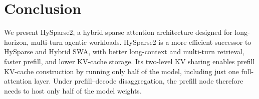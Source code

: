 \section{Conclusion}

We present HySparse2, a hybrid sparse attention architecture designed for long-horizon, multi-turn agentic workloads. HySparse2 is a more efficient successor to HySparse and Hybrid SWA, with better long-context and multi-turn retrieval, faster prefill, and lower KV-cache storage.
Its two-level KV sharing enables prefill KV-cache construction by running only half of the model, including just one full-attention layer.
Under prefill–decode disaggregation, the prefill node therefore needs to host only half of the model weights.